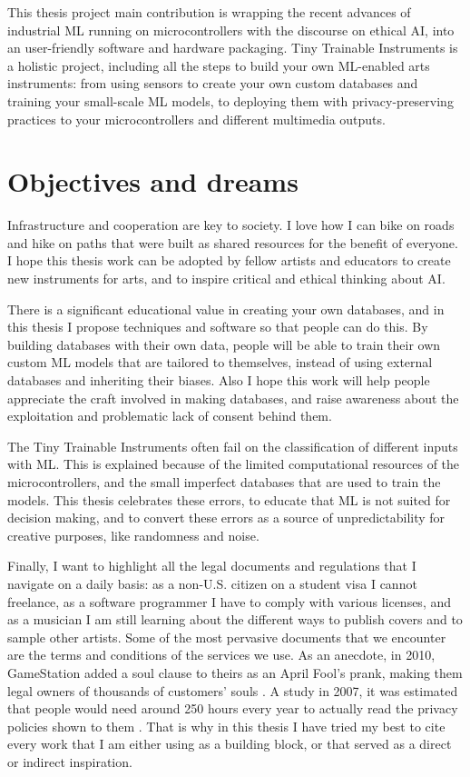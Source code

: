 This thesis project main contribution is wrapping the recent advances of industrial \acrshort{ML} running on microcontrollers with the discourse on ethical \acrshort{AI}, into an user-friendly software and hardware packaging. Tiny Trainable Instruments is a holistic project, including all the steps to build your own \acrshort{ML}-enabled arts instruments: from using sensors to create your own custom databases and training your small-scale \acrshort{ML} models, to deploying them with privacy-preserving practices to your microcontrollers and different multimedia outputs.

\section{Objectives and dreams}

Infrastructure and cooperation are key to society. I love how I can bike on roads and hike on paths that were built as shared resources for the benefit of everyone. I hope this thesis work can be adopted by fellow artists and educators to create new instruments for arts, and to inspire critical and ethical thinking about \acrshort{AI}.

There is a significant educational value in creating your own databases, and in this thesis I propose techniques and software so that people can do this. By building databases with their own data, people will be able to train their own custom \acrshort{ML} models that are tailored to themselves, instead of using external databases and inheriting their biases. Also I hope this work will help people appreciate the craft involved in making databases, and raise awareness about the exploitation and problematic lack of consent behind them.

The Tiny Trainable Instruments often fail on the classification of different inputs with \acrshort{ML}. This is explained because of the limited computational resources of the microcontrollers, and the small imperfect databases that are used to train the models. This thesis celebrates these errors, to educate that \acrshort{ML} is not suited for decision making, and to convert these errors as a source of unpredictability for creative purposes, like randomness and noise.

Finally, I want to highlight all the legal documents and regulations that I navigate on a daily basis: as a non-U.S. citizen on a student visa I cannot freelance, as a software programmer I have to comply with various licenses, and as a musician I am still learning about the different ways to publish covers and to sample other artists. Some of the most pervasive documents that we encounter are the terms and conditions of the services we use. As an anecdote, in 2010, GameStation added a soul clause to theirs as an April Fool's prank, making them legal owners of thousands of customers' souls \cite{website-huffpost-gamestation-soul-clause}. A study in 2007, it was estimated that people would need around 250 hours every year to actually read the privacy policies shown to them \cite{article-cost-of-reading-privacy-policies}. That is why in this thesis I have tried my best to cite every work that I am either using as a building block, or that served as a direct or indirect inspiration.

